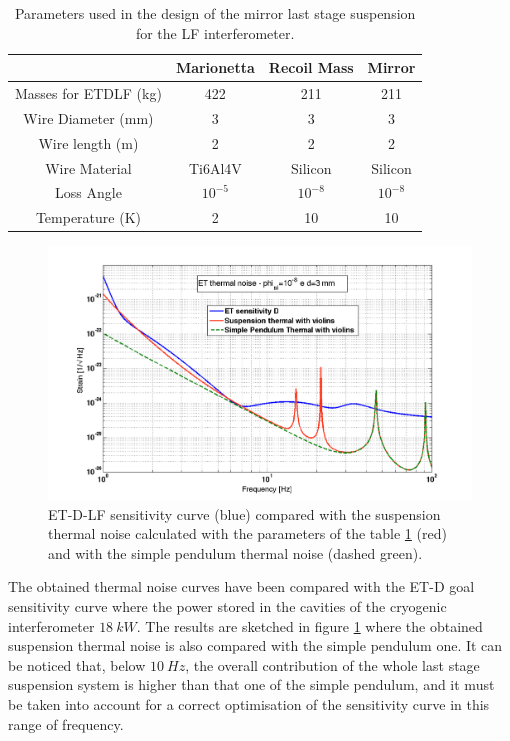 \begin{table}
\begin{center}
\begin{tabular}{|c|c|c|c|}
\hline
				&Marionetta	&Recoil Mass 	& Mirror\\
\hline
Masses for ETDLF (kg)			&422		&211			&211\\
\hline
Wire Diameter (mm)	&3		&3			&3\\
\hline
Wire length (m)	&2		&2			&2\\
\hline
Wire Material		&Ti6Al4V	&Silicon		&Silicon\\
\hline
Loss Angle		&$10^{-5}$&$10^{-8}$&$10^{-8}$\\
\hline
Temperature (K)		&2	&10		&10\\
\hline
\end{tabular}
\caption{Parameters used in the design of the mirror last stage suspension for the LF interferometer.}
\label{Parametri}
\end{center}
\end{table}


\begin{figure}[htbp]
\begin{center}
\includegraphics[width=13cm]{Sec_Suspensions/Figures/ETDLFthermvsETDLFsens3.pdf}
\caption{ET-D-LF sensitivity curve (blue) compared with the suspension thermal noise calculated with the parameters of the table \ref{Parametri} (red) and with the simple pendulum thermal noise (dashed green).}
\label{fig:Sensitivity_ET}
\end{center}
\end{figure}

The obtained thermal noise curves have been compared with the ET-D goal sensitivity curve where the power stored in the cavities of the cryogenic interferometer $18 \ kW$. The results are sketched in figure \ref{fig:Sensitivity_ET} where the obtained suspension thermal noise is also compared with the simple pendulum one. It can be noticed that, below $10 ~ Hz$, the overall contribution of the whole last stage suspension system is higher than that one of the simple pendulum, and it must be taken into account for a correct optimisation of the sensitivity curve in this range of frequency.


